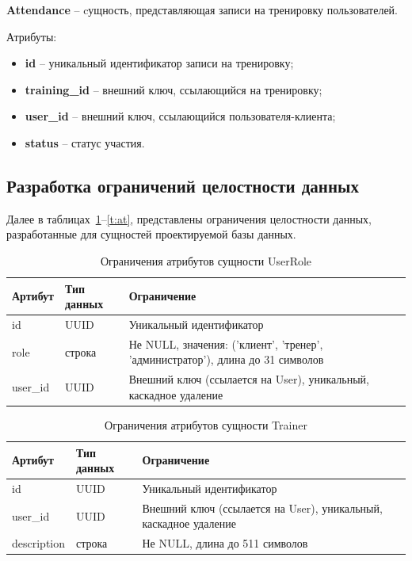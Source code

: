 \textbf{Attendance} -- cущность, представляющая записи на тренировку пользователей.

Атрибуты:
\begin{itemize} 
	\item \textbf{id} -- уникальный идентификатор записи на тренировку;
	\item \textbf{training\_id} -- внешний ключ, ссылающийся на тренировку;
	\item \textbf{user\_id} -- внешний ключ, ссылающийся пользователя-клиента; 
	\item \textbf{status} -- статус участия.
\end{itemize}

\subsection{Разработка ограничений целостности данных}

Далее в таблицах~\ref{t:ur}--\ref{t:at}, представлены ограничения целостности данных, разработанные для сущностей проектируемой базы данных.


\begin{table}[H]
	\centering
	\begin{tabular}{|p{3.5cm}|p{3.5cm}|p{8.5cm}|}
		\hline
		\textbf{Артибут}             & \textbf{Тип данных}   & \textbf{Ограничение}             \\ \hline
		id                            & UUID                  & Уникальный идентификатор         \\ \hline
		role                          & строка                  & Не NULL, значения: ('клиент', 'тренер', 'администратор'), длина до 31 символов \\ \hline
		user\_id                      & UUID                 & Внешний ключ (ссылается на User), уникальный, каскадное удаление \\ \hline
	\end{tabular}
	\caption{Ограничения атрибутов сущности UserRole}
	\label{t:ur}
\end{table}

\begin{table}[H]
	\centering
	\begin{tabular}{|p{3.5cm}|p{3.5cm}|p{8.5cm}|}
		\hline
		\textbf{Артибут}             & \textbf{Тип данных}   & \textbf{Ограничение}             \\ \hline
		id                            & UUID                 & Уникальный идентификатор         \\ \hline
		user\_id                      & UUID                 & Внешний ключ (ссылается на User), уникальный, каскадное удаление \\ \hline
		description                   & строка                  & Не NULL, длина до 511 символов   \\ \hline
	\end{tabular}
	\caption{Ограничения атрибутов сущности Trainer}
\end{table}

